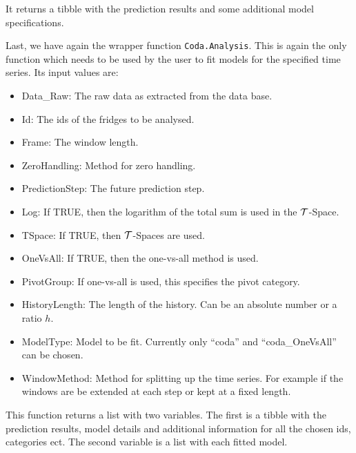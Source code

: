 It returns a tibble with the prediction results and some additional model specifications. 

Last, we have again the wrapper function \texttt{Coda.Analysis}. This is again the only function which needs to be used by the user to fit models for the specified time series. Its input values are:

\begin{itemize}
	\item Data\_Raw: The raw data as extracted from the data base.
	\item Id: The ids of the fridges to be analysed.
	\item Frame: The window length.
	\item ZeroHandling: Method for zero handling. 
	\item PredictionStep: The future prediction step. 
	\item Log: If TRUE, then the logarithm of the total sum is used in the $\mathcal{T}$-Space.
	\item TSpace: If TRUE, then $\mathcal{T}$-Spaces are used. 
	\item OneVsAll: If TRUE, then the one-vs-all method is used. 
	\item PivotGroup: If one-vs-all is used, this specifies the pivot category.
	\item HistoryLength: The length of the history. Can be an absolute number or a ratio $h$. 
	\item ModelType: Model to be fit. Currently only "`coda"' and "`coda\_OneVsAll"' can be chosen.
	\item WindowMethod: Method for splitting up the time series. For example if the windows are be extended at each step or kept at a fixed length.
\end{itemize}

This function returns a list with two variables. The first is a tibble with the prediction results, model details and additional information for all the chosen ids, categories ect. The second variable is a list with each fitted model. 
